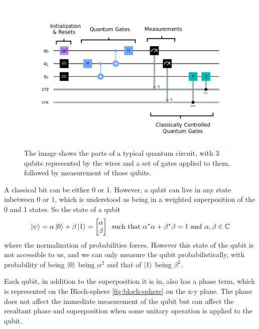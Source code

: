 \begin{figure}[ht]
    \centering
    \includegraphics[width=0.8\linewidth]{figures/quantum/quantum_circuit_example.png}
    \caption[Typical Quantum Circuit]{The image shows the parts of a typical quantum circuit, with 3 qubits represented by the wires and a set of gates applied to them, followed by measurement of those qubits.}
    \label{fig:quantum-circuit-example}
\end{figure}


A classical bit can be either 0 or 1. However, a qubit can live in any state inbetween 0 or 1, which is understood as being in a weighted superposition of the 0 and 1 states. So the state of a qubit 
\begin{equation}
    \ket{\psi} = \alpha \ket{0} + \beta \ket{1} = \begin{bmatrix}\alpha \\ \beta\end{bmatrix} \;\;\text{such that }\alpha^* \alpha + \beta^* \beta = 1 \text{ and } \alpha, \beta \in \mathbb{C}
\end{equation}
where the normalization of probabilities forces. However this state of the qubit is not accessible to us, and we can only measure the qubit probabilistically, with probability of being $\ket{0}$ being $\alpha^2$ and that of $\ket{1}$ being $\beta^2$.

Each qubit, in addition to the superposition it is in, also has a phase term, which is represented on the Bloch-sphere \ref{fig:bloch-sphere} on the x-y plane. The phase does not affect the immediate measurement of the qubit but can affect the resultant phase and superposition when some unitary operation is applied to the qubit.

